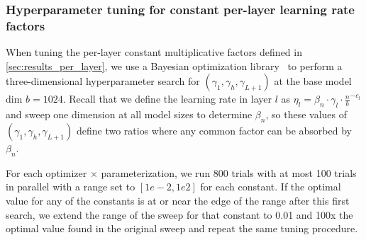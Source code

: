 \documentclass{article}
\theoremstyle{plain}
\theoremstyle{definition}
\theoremstyle{remark}
\begin{document}
\subsubsection{Hyperparameter tuning for constant per-layer learning rate factors}
\label{app:tune_constant_factors}
When tuning the per-layer constant multiplicative factors defined in \cref{sec:results_per_layer}, we use a Bayesian optimization library~\citep{google_vizier} to perform a three-dimensional hyperparameter search for $(\gamma_1, \gamma_h, \gamma_{L+1})$ at the base model dim $b=1024$. Recall that we define the learning rate in layer $l$ as $\eta_l = \beta_n \cdot \gamma_l \cdot \frac{n}{b} ^ {-c_l}$ and sweep one dimension at all model sizes to determine $\beta_n$, so these values of $(\gamma_1, \gamma_h, \gamma_{L+1})$ define two ratios where any common factor can be absorbed by $\beta_n$.

For each optimizer $\times$ parameterization, we run 800 trials with at most 100 trials in parallel with a range set to $[1e-2, 1e2]$ for each constant. If the optimal value for any of the constants is at or near the edge of the range after this first search, we extend the range of the sweep for that constant to 0.01 and 100x the optimal value found in the original sweep and repeat the same tuning procedure.
\end{document}
